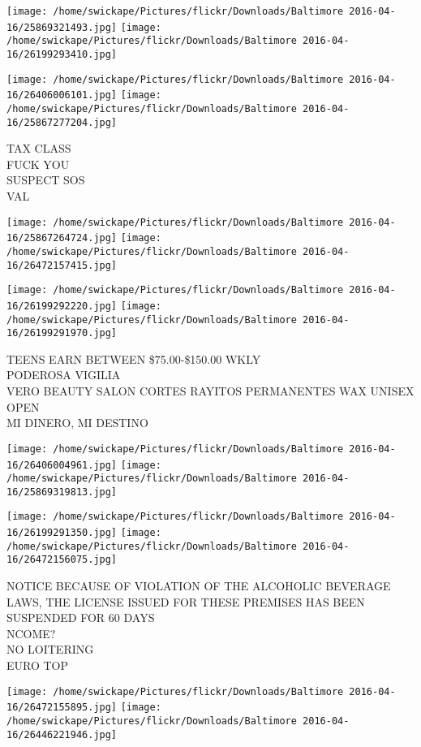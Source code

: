 \documentclass[10pt,letterpaper]{article}
\begin{document}
\texttt{[image: /home/swickape/Pictures/flickr/Downloads/Baltimore 2016-04-16/25869321493.jpg]}
\texttt{[image: /home/swickape/Pictures/flickr/Downloads/Baltimore 2016-04-16/26199293410.jpg]}

\texttt{[image: /home/swickape/Pictures/flickr/Downloads/Baltimore 2016-04-16/26406006101.jpg]}
\texttt{[image: /home/swickape/Pictures/flickr/Downloads/Baltimore 2016-04-16/25867277204.jpg]}

TAX CLASS\\
FUCK YOU\\
SUSPECT SOS\\
VAL
\pagebreak

\texttt{[image: /home/swickape/Pictures/flickr/Downloads/Baltimore 2016-04-16/25867264724.jpg]}
\texttt{[image: /home/swickape/Pictures/flickr/Downloads/Baltimore 2016-04-16/26472157415.jpg]}

\texttt{[image: /home/swickape/Pictures/flickr/Downloads/Baltimore 2016-04-16/26199292220.jpg]}
\texttt{[image: /home/swickape/Pictures/flickr/Downloads/Baltimore 2016-04-16/26199291970.jpg]}

TEENS EARN BETWEEN \$75.00{-}\$150.00 WKLY\\
PODEROSA VIGILIA\\
VERO BEAUTY SALON CORTES RAYITOS PERMANENTES WAX UNISEX OPEN\\
MI DINERO, MI DESTINO
\pagebreak

\texttt{[image: /home/swickape/Pictures/flickr/Downloads/Baltimore 2016-04-16/26406004961.jpg]}
\texttt{[image: /home/swickape/Pictures/flickr/Downloads/Baltimore 2016-04-16/25869319813.jpg]}

\texttt{[image: /home/swickape/Pictures/flickr/Downloads/Baltimore 2016-04-16/26199291350.jpg]}
\texttt{[image: /home/swickape/Pictures/flickr/Downloads/Baltimore 2016-04-16/26472156075.jpg]}

NOTICE BECAUSE OF VIOLATION OF THE ALCOHOLIC BEVERAGE LAWS, THE LICENSE ISSUED FOR THESE PREMISES HAS BEEN SUSPENDED FOR 60 DAYS\\
NCOME?\\
NO LOITERING\\
EURO TOP
\pagebreak

\texttt{[image: /home/swickape/Pictures/flickr/Downloads/Baltimore 2016-04-16/26472155895.jpg]}
\texttt{[image: /home/swickape/Pictures/flickr/Downloads/Baltimore 2016-04-16/26446221946.jpg]}
\end{document}
